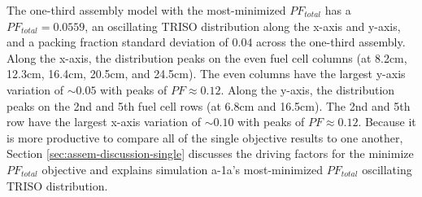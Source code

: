 The one-third assembly model with the most-minimized $PF_{total}$ has a 
$PF_{total} =0.0559$, an oscillating TRISO distribution along the 
x-axis and y-axis, and a packing fraction standard deviation of $0.04$ across the 
one-third assembly. 
Along the x-axis, the distribution peaks on the even fuel cell columns (at 8.2cm, 12.3cm, 
16.4cm, 20.5cm, and 24.5cm). 
The even columns have the largest y-axis variation of ${\sim}0.05$ with peaks of
$PF\approx0.12$.
Along the y-axis, the distribution peaks on the 2nd and 5th fuel cell rows (at 6.8cm and 
16.5cm).
The 2nd and 5th row have the largest x-axis variation of ${\sim}0.10$ with peaks of 
$PF\approx0.12$. 
Because it is more productive to compare all of the single objective results to one 
another, Section \ref{sec:assem-discussion-single} discusses the driving factors for
the minimize $PF_{total}$ objective and explains simulation a-1a's most-minimized 
$PF_{total}$ oscillating TRISO distribution. 

